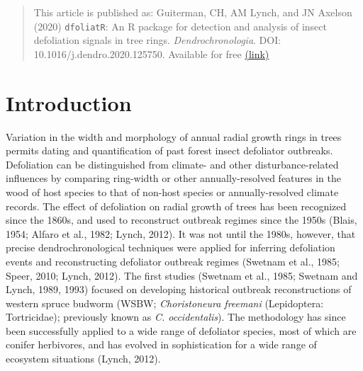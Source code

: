 \documentclass[review]{elsarticle} %
\begin{document}
\begin{quote}
This article is published as: Guiterman, CH, AM Lynch, and JN Axelson (2020) \texttt{dfoliatR}: An R package for detection and analysis of insect defoliation signals in tree rings. \emph{Dendrochronologia}. DOI: 10.1016/j.dendro.2020.125750. Available for free \href{https://authors.elsevier.com/sd/article/S1125786520300898}{(link)}
\end{quote}

\hypertarget{introduction}{%
\section{Introduction}\label{introduction}}

Variation in the width and morphology of annual radial growth rings in trees permits dating and quantification of past forest insect defoliator outbreaks. Defoliation can be distinguished from climate- and other disturbance-related influences by comparing ring-width or other annually-resolved features in the wood of host species to that of non-host species or annually-resolved climate records. The effect of defoliation on radial growth of trees has been recognized since the 1860s, and used to reconstruct outbreak regimes since the 1950s (Blais, 1954; Alfaro et al., 1982; Lynch, 2012). It was not until the 1980s, however, that precise dendrochronological techniques were applied for inferring defoliation events and reconstructing defoliator outbreak regimes (Swetnam et al., 1985; Speer, 2010; Lynch, 2012). The first studies (Swetnam et al., 1985; Swetnam and Lynch, 1989, 1993) focused on developing historical outbreak reconstructions of western spruce budworm (WSBW; \emph{Choristoneura freemani} (Lepidoptera: Tortricidae); previously known as \emph{C. occidentalis}). The methodology has since been successfully applied to a wide range of defoliator species, most of which are conifer herbivores, and has evolved in sophistication for a wide range of ecosystem situations (Lynch, 2012).
\end{document}
